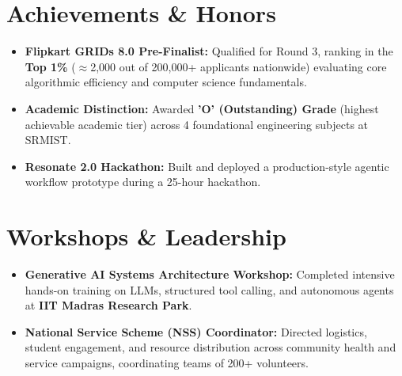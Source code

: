 \documentclass[letterpaper,10pt]{article}
\newcommand{\resumeItem}[1]{
  \item\small{
    {#1 \vspace{-2pt}}
  }
}
\newcommand{\resumeSubHeadingListStart}{\begin{itemize}[leftmargin=0.0in, label={}]}
\newcommand{\resumeSubHeadingListEnd}{\end{itemize}}
\newcommand{\resumeItemListStart}{\begin{itemize}[leftmargin=0.15in, label=\raisebox{0.15ex}{\tiny$\bullet$}, itemsep=1.5pt]}
\newcommand{\resumeItemListEnd}{\end{itemize}\vspace{-3pt}}
\begin{document}
\section{Achievements \& Honors}
    \resumeSubHeadingListStart
        \resumeItemListStart
            \resumeItem{\textbf{Flipkart GRIDs 8.0 Pre-Finalist:} Qualified for Round 3, ranking in the \textbf{Top 1\%} ($\approx$2,000 out of 200,000+ applicants nationwide) evaluating core algorithmic efficiency and computer science fundamentals.}
            \resumeItem{\textbf{Academic Distinction:} Awarded \textbf{'O' (Outstanding) Grade} (highest achievable academic tier) across 4 foundational engineering subjects at SRMIST.}
            \resumeItem{\textbf{Resonate 2.0 Hackathon:} Built and deployed a production-style agentic workflow prototype during a 25-hour hackathon.}
        \resumeItemListEnd
    \resumeSubHeadingListEnd

\section{Workshops \& Leadership}
    \resumeSubHeadingListStart
        \resumeItemListStart
            \resumeItem{\textbf{Generative AI Systems Architecture Workshop:} Completed intensive hands-on training on LLMs, structured tool calling, and autonomous agents at \textbf{IIT Madras Research Park}.}
            \resumeItem{\textbf{National Service Scheme (NSS) Coordinator:} Directed logistics, student engagement, and resource distribution across community health and service campaigns, coordinating teams of 200+ volunteers.}
        \resumeItemListEnd
    \resumeSubHeadingListEnd
\end{document}
